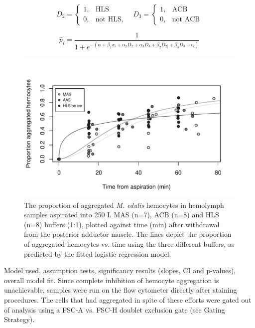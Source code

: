 \begin{equation}
    \label{eq:dummy_variables}
D_{2} =\begin{cases}
      1, & \text{HLS}\\
      0, & \text{not HLS},
    \end{cases}
    \quad
D_{3} =\begin{cases}
      1, & \text{ACB}\\
      0, & \text{not ACB}
    \end{cases}
\end{equation}

\begin{equation}
\label{eq:logit}
\hat{p}_{i} = \dfrac{1}{1 + e^{-(\alpha + \beta_{1} x_{i} + \alpha_{2} D_{2} + \alpha_{3} D_{3} + \beta_{2} D_{2]} + \beta_{3} D_{3} + \epsilon_{i})}}
\end{equation}

\begin{figure}[!ht]
    \centering
    \includegraphics[width=1.0\textwidth]{figures/greys368.pdf}
    \caption{The proportion of aggregated \emph{M. edulis} hemocytes in hemolymph samples aspirated into 250 \micro L MAS (n=7), ACB (n=8) and HLS (n=8) buffers (1:1), plotted against time (min) after withdrawal from the posterior adductor muscle. The lines depict the proportion of aggregated hemocytes vs. time using the three different buffers, as predicted by the fitted logistic regression model.}
    \label{fig:aggregation}
\end{figure}

Model used, assumption tests, significancy results (slopes, CI and p-values), overall model fit.
Since complete inhibition of hemocyte aggregation is unachievable, samples were run on the flow cytometer directly after staining procedures. The cells that had aggregated in spite of these efforts were gated out of analysis using a FSC-A vs. FSC-H doublet exclusion gate (see Gating Strategy).


